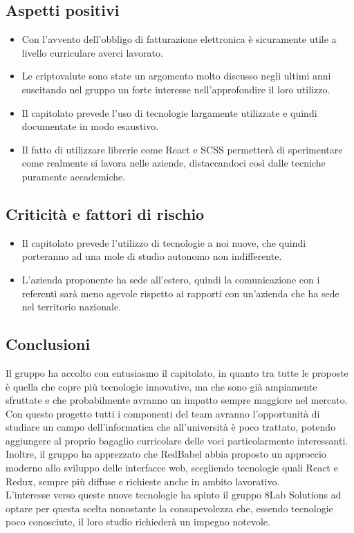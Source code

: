 \subsection{Aspetti positivi}
\begin{itemize}
	\item Con l'avvento dell'obbligo di fatturazione elettronica è sicuramente
	utile a livello curriculare averci lavorato.
	\item Le criptovalute sono state un argomento molto discusso negli ultimi anni 
suscitando nel gruppo un forte interesse nell'approfondire il loro utilizzo.
	\item Il capitolato prevede l'uso di tecnologie largamente utilizzate e quindi documentate in modo esaustivo.
	\item Il fatto di utilizzare librerie come React e SCSS permetterà di
	sperimentare come realmente si lavora nelle aziende, distaccandoci così dalle tecniche puramente accademiche.
\end{itemize}

\subsection{Criticità e fattori di rischio}
\begin{itemize}
	\item Il capitolato prevede l'utilizzo di tecnologie a noi nuove, che quindi porteranno ad una mole di studio autonomo non indifferente.
	\item L'azienda proponente ha sede all'estero, quindi la comunicazione con i referenti sarà meno agevole rispetto ai rapporti con un'azienda che ha sede nel territorio nazionale.
\end{itemize}

\subsection{Conclusioni} Il gruppo ha accolto con entusiasmo il capitolato, in 
quanto tra tutte le proposte è quella che copre più tecnologie innovative, ma 
che sono già ampiamente sfruttate e che probabilmente avranno un impatto sempre 
maggiore nel mercato. Con questo progetto tutti i componenti del team avranno 
l'opportunità di studiare un 
campo dell'informatica che all'università è poco trattato, potendo aggiungere al proprio bagaglio curricolare delle voci particolarmente interessanti. Inoltre, il gruppo ha apprezzato che RedBabel abbia proposto un approccio moderno allo sviluppo delle interfacce web, scegliendo tecnologie quali React e Redux, sempre più diffuse e richieste anche in ambito lavorativo.\\
L'interesse verso queste nuove tecnologie ha spinto il gruppo 8Lab Solutions ad 
optare per questa scelta nonostante la consapevolezza che, essendo tecnologie 
poco conosciute, il loro studio richiederà un impegno notevole.

